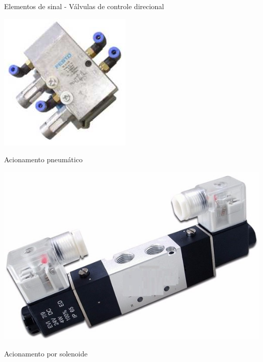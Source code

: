 \begin{frame}{Elementos de sinal - Válvulas de controle direcional}
	\begin{minipage}[c]{0.48\linewidth}
		\centering
		\includegraphics[width=0.9\linewidth]{Figuras/Ch14/fig17}
		
		\medskip
		
		Acionamento pneumático
	\end{minipage}
	\hfill
	\begin{minipage}[c]{0.48\linewidth}
		\centering
		\includegraphics[width=1\linewidth]{Figuras/Ch14/fig18}
		
		\bigskip
		
		Acionamento por solenoide
	\end{minipage}
\end{frame}


